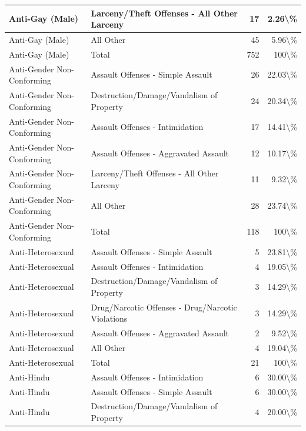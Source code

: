 \documentclass[
]{krantz}
\begin{document}
\begin{longtable}[t]{l|l|r|r}
Anti-Gay (Male) & Larceny/Theft Offenses - All Other Larceny & 17 & 2.26\textbackslash{}\%\\
\hline
Anti-Gay (Male) & All Other & 45 & 5.96\textbackslash{}\%\\
\hline
Anti-Gay (Male) & Total & 752 & 100\textbackslash{}\%\\
\hline
Anti-Gender Non-Conforming & Assault Offenses - Simple Assault & 26 & 22.03\textbackslash{}\%\\
\hline
Anti-Gender Non-Conforming & Destruction/Damage/Vandalism of Property & 24 & 20.34\textbackslash{}\%\\
\hline
Anti-Gender Non-Conforming & Assault Offenses - Intimidation & 17 & 14.41\textbackslash{}\%\\
\hline
Anti-Gender Non-Conforming & Assault Offenses - Aggravated Assault & 12 & 10.17\textbackslash{}\%\\
\hline
Anti-Gender Non-Conforming & Larceny/Theft Offenses - All Other Larceny & 11 & 9.32\textbackslash{}\%\\
\hline
Anti-Gender Non-Conforming & All Other & 28 & 23.74\textbackslash{}\%\\
\hline
Anti-Gender Non-Conforming & Total & 118 & 100\textbackslash{}\%\\
\hline
Anti-Heterosexual & Assault Offenses - Simple Assault & 5 & 23.81\textbackslash{}\%\\
\hline
Anti-Heterosexual & Assault Offenses - Intimidation & 4 & 19.05\textbackslash{}\%\\
\hline
Anti-Heterosexual & Destruction/Damage/Vandalism of Property & 3 & 14.29\textbackslash{}\%\\
\hline
Anti-Heterosexual & Drug/Narcotic Offenses - Drug/Narcotic Violations & 3 & 14.29\textbackslash{}\%\\
\hline
Anti-Heterosexual & Assault Offenses - Aggravated Assault & 2 & 9.52\textbackslash{}\%\\
\hline
Anti-Heterosexual & All Other & 4 & 19.04\textbackslash{}\%\\
\hline
Anti-Heterosexual & Total & 21 & 100\textbackslash{}\%\\
\hline
Anti-Hindu & Assault Offenses - Intimidation & 6 & 30.00\textbackslash{}\%\\
\hline
Anti-Hindu & Assault Offenses - Simple Assault & 6 & 30.00\textbackslash{}\%\\
\hline
Anti-Hindu & Destruction/Damage/Vandalism of Property & 4 & 20.00\textbackslash{}\%\\
\hline

\end{longtable}
\end{document}
